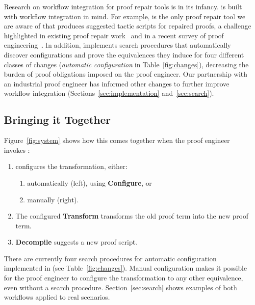 Research on workflow integration for proof repair tools is in its infancy.
\toolname is built with workflow integration in mind.
For example, \toolname is the only proof repair tool we are aware of that produces suggested tactic scripts for repaired proofs,
a challenge highlighted in existing proof repair work~\cite{pumpkinpatch, robert2018} and in 
a recent survey of proof engineering~\cite{PGL-045}.
In addition, \toolname implements search procedures that 
automatically discover configurations and prove the equivalences they induce for four different classes of 
changes (\textit{automatic configuration} in Table~\ref{fig:changes}),
decreasing the burden of proof obligations imposed on the proof engineer.
Our partnership with an industrial proof engineer has informed other changes to further improve workflow integration
(Sections~\ref{sec:implementation} and~\ref{sec:search}).

\subsection*{Bringing it Together}

Figure~\ref{fig:system} shows how this comes together when the proof engineer invokes \toolname:

\begin{enumerate}
\item \toolname configures the transformation, either:
\begin{enumerate}
\item automatically (left), using \textbf{Configure}, or
\item manually (right).
\end{enumerate}
\item The configured \textbf{Transform} transforms the old proof term into the new proof term.
\item \textbf{Decompile} suggests a new proof script. %
\end{enumerate}

There are currently four search procedures for automatic configuration implemented in \toolname (see Table~\ref{fig:changes}).
Manual configuration makes it possible
for the proof engineer to configure the transformation to any other equivalence,
even without a search procedure.
Section~\ref{sec:search} shows examples of both workflows applied to real scenarios.


